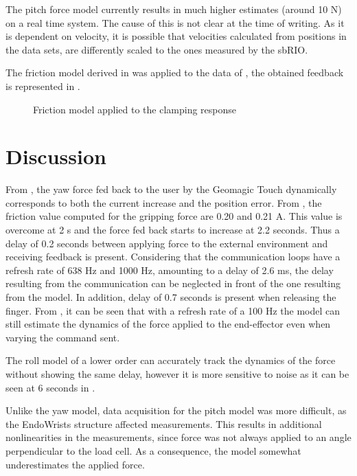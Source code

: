 The pitch force model currently results in much higher estimates (around 10 N) on a real time system. The cause of this is not clear at the time of writing. As it is dependent on velocity, it is possible that velocities calculated from positions in the data sets, are differently scaled to the ones measured by the sbRIO.


The friction model derived in  was applied to the data of , the obtained feedback is represented in .
\begin{figure}[H]

\caption{Friction model applied to the clamping response}
\label{fig:friction_validation}
\end{figure}


\section{Discussion}


From , the yaw force fed back to the user by the Geomagic Touch dynamically corresponds to both the current increase and the position error. From , the friction value computed for the gripping force are 0.20 and 0.21 A. This value is overcome at 2 s and the force fed back starts to increase at 2.2 seconds. Thus a delay of 0.2 seconds between applying force to the external environment and receiving feedback is present. Considering that the communication loops have a refresh rate of 638 Hz and 1000 Hz, amounting to a delay of 2.6 ms, the delay resulting from the communication can be neglected in front of the one resulting from the model. In addition, delay of 0.7 seconds is present when releasing the finger.
From , it can be seen that with a refresh rate of a 100 Hz the model can still estimate the dynamics of the force applied to the end-effector even when varying the command sent.

The roll model of a lower order can accurately track the dynamics of the force without showing the same delay, however it is more sensitive to noise as it can be seen at 6 seconds in .

Unlike the yaw model, data acquisition for the pitch model was more difficult, as the EndoWrists structure affected measurements.
This results in additional nonlinearities in the measurements, since force was not always applied to an angle perpendicular to the load cell.
As a consequence, the model somewhat underestimates the applied force.

